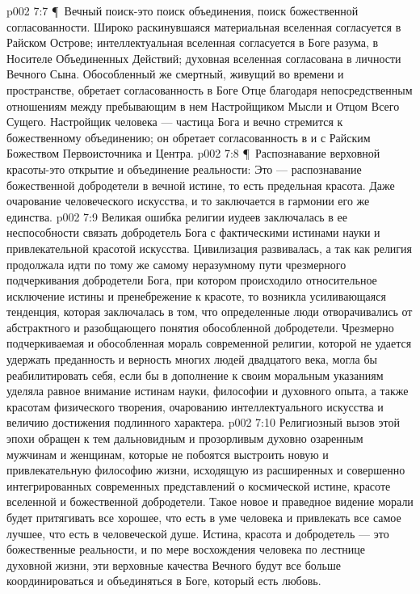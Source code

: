 \vs p002 7:7 \P\ Вечный поиск\hyp{}это поиск объединения, поиск божественной согласованности. Широко раскинувшаяся материальная вселенная согласуется в Райском Острове; интеллектуальная вселенная согласуется в Боге разума, в Носителе Объединенных Действий; духовная вселенная согласована в личности Вечного Сына. Обособленный же смертный, живущий во времени и пространстве, обретает согласованность в Боге Отце благодаря непосредственным отношениям между пребывающим в нем Настройщиком Мысли и Отцом Всего Сущего. Настройщик человека --- частица Бога и вечно стремится к божественному объединению; он обретает согласованность в и с Райским Божеством Первоисточника и Центра.
\vs p002 7:8 \P\ Распознавание верховной красоты\hyp{}это открытие и объединение реальности: Это --- распознавание божественной добродетели в вечной истине, то есть предельная красота. Даже очарование человеческого искусства, и то заключается в гармонии его же единства.
\vs p002 7:9 Великая ошибка религии иудеев заключалась в ее неспособности связать добродетель Бога с фактическими истинами науки и привлекательной красотой искусства. Цивилизация развивалась, а так как религия продолжала идти по тому же самому неразумному пути чрезмерного подчеркивания добродетели Бога, при котором происходило относительное исключение истины и пренебрежение к красоте, то возникла усиливающаяся тенденция, которая заключалась в том, что определенные люди отворачивались от абстрактного и разобщающего понятия обособленной добродетели. Чрезмерно подчеркиваемая и обособленная мораль современной религии, которой не удается удержать преданность и верность многих людей двадцатого века, могла бы реабилитировать себя, если бы в дополнение к своим моральным указаниям уделяла равное внимание истинам науки, философии и духовного опыта, а также красотам физического творения, очарованию интеллектуального искусства и величию достижения подлинного характера.
\vs p002 7:10 Религиозный вызов этой эпохи обращен к тем дальновидным и прозорливым духовно озаренным мужчинам и женщинам, которые не побоятся выстроить новую и привлекательную философию жизни, исходящую из расширенных и совершенно интегрированных современных представлений о космической истине, красоте вселенной и божественной добродетели. Такое новое и праведное видение морали будет притягивать все хорошее, что есть в уме человека и привлекать все самое лучшее, что есть в человеческой душе. Истина, красота и добродетель --- это божественные реальности, и по мере восхождения человека по лестнице духовной жизни, эти верховные качества Вечного будут все больше координироваться и объединяться в Боге, который есть любовь.
